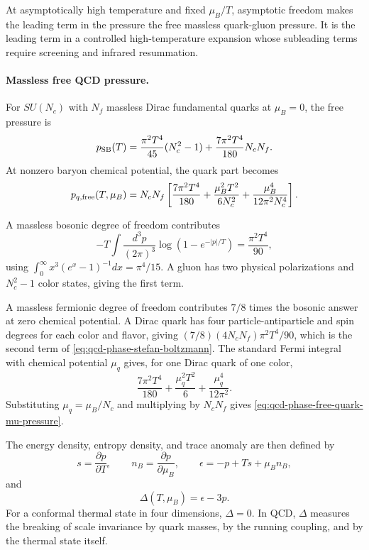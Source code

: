 At asymptotically high temperature and fixed \(\mu_B/T\), asymptotic freedom
makes the leading term in the pressure the free massless quark-gluon pressure.
It is the leading term in a controlled high-temperature expansion whose
subleading terms require screening and infrared resummation.

\paragraph{Massless free QCD pressure.}
For \(SU(N_c)\) with \(N_f\) massless Dirac fundamental quarks at
\(\mu_B=0\), the free pressure is
\begin{equation}
  p_{\rm SB}(T)
  =
  \frac{\pi^2T^4}{45}(N_c^2-1)
  +
  \frac{7\pi^2T^4}{180}N_cN_f .
  \label{eq:qcd-phase-stefan-boltzmann}
\end{equation}
At nonzero baryon chemical potential, the quark part becomes
\begin{equation}
  p_{q,{\rm free}}(T,\mu_B)
  =
  N_cN_f\left[
  \frac{7\pi^2T^4}{180}
  +\frac{\mu_B^2T^2}{6N_c^2}
  +\frac{\mu_B^4}{12\pi^2N_c^4}
  \right].
  \label{eq:qcd-phase-free-quark-mu-pressure}
\end{equation}

A massless bosonic degree of freedom contributes
\[
  -T\int\frac{d^3p}{(2\pi)^3}\log(1-e^{-|p|/T})
  =
  \frac{\pi^2T^4}{90},
\]
using \(\int_0^\infty x^3(e^x-1)^{-1}dx=\pi^4/15\).  A gluon has two
physical polarizations and \(N_c^2-1\) color states, giving the first term.

A massless fermionic degree of freedom contributes \(7/8\) times the bosonic
answer at zero chemical potential.  A Dirac quark has four
particle-antiparticle and spin degrees for each color and flavor, giving
\((7/8)(4N_cN_f)\pi^2T^4/90\), which is the second term of
\eqref{eq:qcd-phase-stefan-boltzmann}.  The standard Fermi integral with
chemical potential \(\mu_q\) gives, for one Dirac quark of one color,
\[
  \frac{7\pi^2T^4}{180}
  +\frac{\mu_q^2T^2}{6}
  +\frac{\mu_q^4}{12\pi^2}.
\]
Substituting \(\mu_q=\mu_B/N_c\) and multiplying by \(N_cN_f\) gives
\eqref{eq:qcd-phase-free-quark-mu-pressure}.

The energy density, entropy density, and trace anomaly are then defined by
\[
  s=\frac{\partial p}{\partial T},\qquad
  n_B=\frac{\partial p}{\partial\mu_B},\qquad
  \epsilon=-p+Ts+\mu_B n_B,
\]
and
\[
  \Delta(T,\mu_B)=\epsilon-3p .
\]
For a conformal thermal state in four dimensions, \(\Delta=0\).  In QCD,
\(\Delta\) measures the breaking of scale invariance by quark masses, by the
running coupling, and by the thermal state itself.

